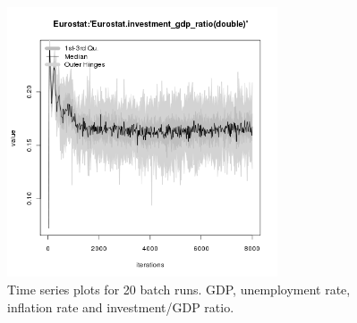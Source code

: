 \begin{figure}[ht!]
\begin{minipage}{17cm}
\includegraphics[width=8cm]{./transient/tax_0.08/Eurostat-investment_gdp_ratio.png}
\end{minipage}
\caption{Time series plots for 20 batch runs. GDP, unemployment rate, inflation rate and investment/GDP ratio.}
\label{Figure: transient time}
\end{figure}


